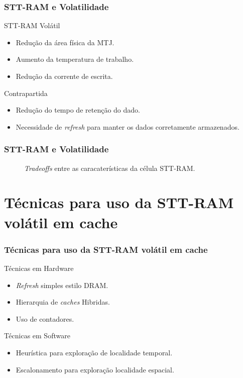 \documentclass[10pt, pdf,xcolor=pdftex,dvipsnames,table]{beamer}
\begin{document}
\frame
{
\frametitle{STT-RAM e Volatilidade}
		\begin{block}{STT-RAM Volátil}
			\begin{itemize}
				\item Redução da área física da MTJ.
				\item Aumento da temperatura de trabalho.
				\item Redução da corrente de escrita.
			\end{itemize}	 
		\end{block}
		\begin{block}{Contrapartida}
			\begin{itemize}
				\item Redução do tempo de retenção do dado.
				\item Necessidade de \textit{refresh} para manter os dados corretamente armazenados.
			\end{itemize}	 
		\end{block}
}

\frame
{
\frametitle{STT-RAM e Volatilidade}
	\begin{figure}[!h]
	 \centering
	 	\caption{\textit{Tradeoffs} entre as caracaterísticas da célula STT-RAM.}
	 	\label{fig:we}
	 \end{figure}	
}

\section{Técnicas para uso da STT-RAM volátil em cache}

\frame
{
\frametitle{Técnicas para uso da STT-RAM volátil em cache}
		\begin{block}{Técnicas em Hardware}
			\begin{itemize}
				\item \textit{Refresh} simples estilo DRAM.
				\item Hierarquia de \textit{caches} Hibridas.
				\item Uso de contadores.
			\end{itemize}	 
		\end{block}
		\begin{block}{Técnicas em Software}
			\begin{itemize}
				\item Heurística para exploração de localidade temporal.
				\item Escalonamento para exploração localidade espacial.
			\end{itemize}
		\end{block}
}
\end{document}
